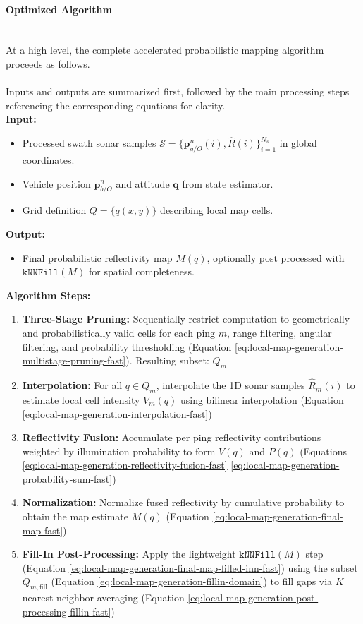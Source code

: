 \paragraph{Optimized Algorithm} \mbox{}\\[0.5em] \noindent
At a high level, the complete accelerated probabilistic mapping algorithm proceeds as follows.  
\\ \\
Inputs and outputs are summarized first, followed by the main processing steps referencing the corresponding equations for clarity. 
\\ \noindent
\textbf{Input:}
\begin{itemize}
    \item Processed swath sonar samples $\mathcal{S} = \{\mathbf{p}_{g/O}^{n}(i), \hat{R}(i)\}_{i=1}^{N_s}$ in global coordinates.
    \item Vehicle position $\mathbf{p}_{b/O}^{n}$ and attitude $\mathbf{q}$ from state estimator.
    \item Grid definition $Q = \{q(x,y)\}$ describing local map cells.
\end{itemize}
\noindent
\textbf{Output:}
\begin{itemize}
    \item Final probabilistic reflectivity map $M(q)$, optionally post processed with $\texttt{kNNFill}(M)$ for spatial completeness.
\end{itemize}
\noindent
\textbf{Algorithm Steps:}
\begin{enumerate}
    \item \textbf{Three-Stage Pruning:}  
    Sequentially restrict computation to geometrically and probabilistically valid cells for each ping $m$, range filtering, angular filtering, and probability thresholding (Equation \ref{eq:local-map-generation-multistage-pruning-fast}). Resulting subset: $Q_m$

    \item \textbf{Interpolation:}  
    For all $q \in Q_m$, interpolate the 1D sonar samples $\hat{R}_m(i)$ to estimate local cell intensity $V_m(q)$ using bilinear interpolation (Equation \ref{eq:local-map-generation-interpolation-fast})

    \item \textbf{Reflectivity Fusion:}  
    Accumulate per ping reflectivity contributions weighted by illumination probability to form $V(q)$ and $P(q)$ (Equations \ref{eq:local-map-generation-reflectivity-fusion-fast} \ref{eq:local-map-generation-probability-sum-fast})

    \item \textbf{Normalization:}  
    Normalize fused reflectivity by cumulative probability to obtain the map estimate $M(q)$ (Equation \ref{eq:local-map-generation-final-map-fast})

    \item \textbf{Fill-In Post-Processing:}  
    Apply the lightweight $\texttt{kNNFill}(M)$ step (Equation \ref{eq:local-map-generation-final-map-filled-inn-fast})  
    using the subset $Q_{m,\text{fill}}$ (Equation \ref{eq:local-map-generation-fillin-domain}) to fill gaps via $K$ nearest neighbor averaging (Equation \ref{eq:local-map-generation-post-processing-fillin-fast})
\end{enumerate}
